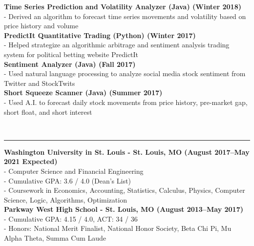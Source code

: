 \documentclass[11pt]{article}
\begin{document}
\begin{titlepage}
\begin{addmargin}[1em]{0em}
			\textbf{Time Series Prediction and Volatility Analyzer (Java) \hfill (Winter 2018)}\\
- Derived an algorithm to forecast time series movements and volatility based on price history and volume \\
			\textbf{PredictIt Quantitative Trading (Python) \hfill (Winter 2017)}\\
- Helped strategize an algorithmic arbitrage and sentiment analysis trading system for political betting website PredictIt \\
            \textbf{Sentiment Analyzer (Java) \hfill (Fall 2017)}\\	
- Used natural language processing to analyze social media stock sentiment from Twitter and StockTwits\\
			\textbf{Short Squeeze Scanner (Java) \hfill (Summer 2017)}\\
- Used A.I. to forecast daily stock movements from price history, pre-market gap, short float, and short interest\\
		\end{addmargin}
		\vspace{-10pt}
		\noindent
		\\\rule{\textwidth}{0.4pt}
		\begin{addmargin}[1em]{0em}
			\textbf{Washington University in St. Louis - St. Louis, MO \hfill (August 2017–May 2021 Expected)}\\
- Computer Science and Financial Engineering\\
- Cumulative GPA: 3.6 / 4.0 (Dean's List)\\
- Coursework in Economics, Accounting, Statistics, Calculus, Physics, Computer Science, Logic, Algorithms, Optimization \\
			\textbf{Parkway West High School - St. Louis, MO \hfill (August 2013–May 2017)}\\
- Cumulative GPA: 4.15 / 4.0, ACT: 34 / 36\\
- Honors: National Merit Finalist, National Honor Society, Beta Chi Pi, Mu Alpha Theta, Summa Cum Laude \\
		\end{addmargin}
	\end{titlepage}
\end{document}
